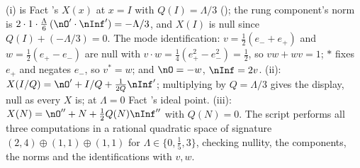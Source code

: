 (i) is Fact 's $X(x)$ at $x = I$ with $Q(I) = \Lambda/3$ (); the rung component's norm is $2 \cdot 1 \cdot \tfrac{\Lambda}{6}\,(\nO' \cdot \nInf') = -\Lambda/3$, and $X(I)$ is null since $Q(I) + (-\Lambda/3) = 0$. The mode identification: $v = \tfrac12(e_{-} + e_{+})$ and $w = \tfrac12(e_{+} - e_{-})$ are null with $v \cdot w = \tfrac14(e_{+}^{2} - e_{-}^{2}) = \tfrac12$, so $vw + wv = 1$; $*$ fixes $e_{+}$ and negates $e_{-}$, so $v^{*} = w$; and $\nO = -w$, $\nInf = 2v$. (ii): $X(I/Q) = \nO' + I/Q + \tfrac{1}{2Q}\nInf'$; multiplying by $Q = \Lambda/3$ gives the display, null as every $X$ is; at $\Lambda = 0$ Fact 's ideal point. (iii): $X(N) = \nO'' + N + \tfrac12 Q(N)\nInf''$ with $Q(N) = 0$. The script performs all three computations in a rational quadratic space of signature $(2,4) \oplus (1,1) \oplus (1,1)$ for $\Lambda \in \{0, \tfrac15, 3\}$, checking nullity, the components, the norms and the identifications with $v, w$.
